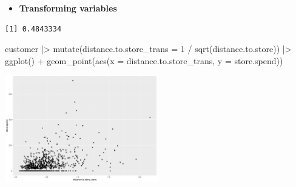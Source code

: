 \documentclass[
  ignorenonframetext,
]{beamer}
\newenvironment{Shaded}{\begin{snugshade}}{\end{snugshade}}
\newcommand{\AttributeTok}[1]{\textcolor[rgb]{0.40,0.45,0.13}{#1}}
\newcommand{\DecValTok}[1]{\textcolor[rgb]{0.68,0.00,0.00}{#1}}
\newcommand{\FunctionTok}[1]{\textcolor[rgb]{0.28,0.35,0.67}{#1}}
\newcommand{\NormalTok}[1]{\textcolor[rgb]{0.00,0.23,0.31}{#1}}
\newcommand{\SpecialCharTok}[1]{\textcolor[rgb]{0.37,0.37,0.37}{#1}}
\providecommand{\tightlist}{%
  \setlength{\itemsep}{0pt}\setlength{\parskip}{0pt}}\usepackage{longtable,booktabs,array}
\begin{document}
\begin{frame}[fragile]{}
\label{section-22}
\begin{itemize}
\tightlist
\item
  \textbf{Transforming variables}
\end{itemize}

\tiny

\begin{Shaded}
\end{Shaded}

\begin{verbatim}
[1] 0.4843334
\end{verbatim}

\begin{Shaded}
\begin{Highlighting}[]
\NormalTok{customer }\SpecialCharTok{|\textgreater{}}
  \FunctionTok{mutate}\NormalTok{(}\AttributeTok{distance.to.store\_trans =} \DecValTok{1} \SpecialCharTok{/} \FunctionTok{sqrt}\NormalTok{(distance.to.store)) }\SpecialCharTok{|\textgreater{}}
  \FunctionTok{ggplot}\NormalTok{() }\SpecialCharTok{+}
  \FunctionTok{geom\_point}\NormalTok{(}\FunctionTok{aes}\NormalTok{(}\AttributeTok{x =}\NormalTok{ distance.to.store\_trans, }\AttributeTok{y =}\NormalTok{ store.spend))}
\end{Highlighting}
\end{Shaded}

\begin{center}
\includegraphics[width=0.5\textwidth,height=\textheight]{004_relationships_between_continuous_variables_files/figure-beamer/unnamed-chunk-22-1.pdf}
\end{center}
\end{frame}
\end{document}
